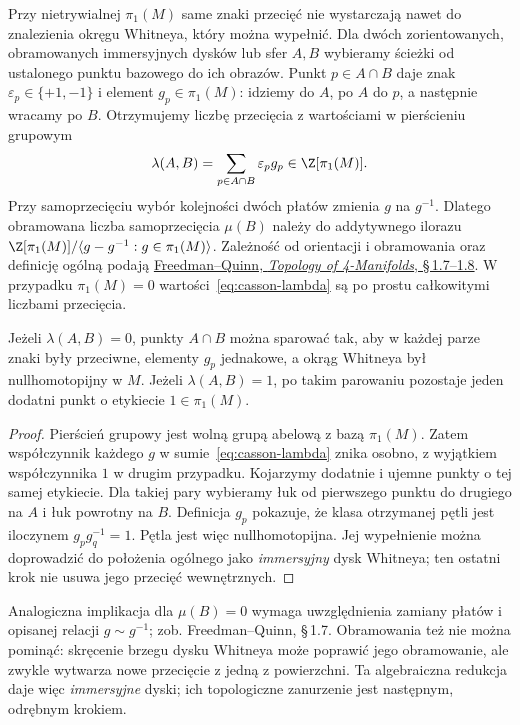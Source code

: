 Przy nietrywialnej $\pi_1(M)$ same znaki przecięć
nie wystarczają nawet do znalezienia okręgu
Whitneya, który można wypełnić. Dla dwóch
zorientowanych, obramowanych immersyjnych dysków
lub sfer $A,B$ wybieramy ścieżki od ustalonego
punktu bazowego do ich obrazów. Punkt
$p\in A\cap B$ daje znak $\varepsilon_p\in\{+1,-1\}$
i element $g_p\in\pi_1(M)$: idziemy do $A$,
po $A$ do $p$, a następnie wracamy po $B$.
Otrzymujemy liczbę przecięcia z wartościami w
pierścieniu grupowym
\begin{equation}\label{eq:casson-lambda}
 \lambda(A,B)=\sum_{p\in A\cap B}
             \varepsilon_p g_p\in\Z[\pi_1(M)].
\end{equation}
Przy samoprzecięciu wybór kolejności dwóch płatów
zmienia $g$ na $g^{-1}$. Dlatego obramowana
liczba samoprzecięcia $\mu(B)$ należy do
addytywnego ilorazu
$\Z[\pi_1(M)]/\langle g-g^{-1}:g\in\pi_1(M)\rangle$.
Zależność od orientacji i obramowania oraz definicję
ogólną podają
\href{https://archive.mpim-bonn.mpg.de/4789/2/FreedmanQuinn-TopologyOf4Manifolds-Reformatted2013.pdf}
{Freedman--Quinn, \emph{Topology of 4-Manifolds},
\S\,1.7--1.8}. W przypadku $\pi_1(M)=0$
wartości~\eqref{eq:casson-lambda} są po prostu
całkowitymi liczbami przecięcia.

\begin{stwierdzenie}
\label{prop:casson-pairing}
Jeżeli $\lambda(A,B)=0$, punkty $A\cap B$ można
sparować tak, aby w każdej parze znaki były
przeciwne, elementy $g_p$ jednakowe, a okrąg
Whitneya był nullhomotopijny w $M$. Jeżeli
$\lambda(A,B)=1$, po takim parowaniu pozostaje
jeden dodatni punkt o etykiecie $1\in\pi_1(M)$.
\end{stwierdzenie}
\begin{proof}
Pierścień grupowy jest wolną grupą abelową z bazą
$\pi_1(M)$. Zatem współczynnik każdego $g$
w sumie~\eqref{eq:casson-lambda} znika osobno,
z wyjątkiem współczynnika $1$ w drugim przypadku.
Kojarzymy dodatnie i ujemne punkty o tej samej
etykiecie. Dla takiej pary wybieramy łuk od
pierwszego punktu do drugiego na $A$ i łuk
powrotny na $B$. Definicja $g_p$ pokazuje,
że klasa otrzymanej pętli jest iloczynem
$g_p g_q^{-1}=1$. Pętla jest więc nullhomotopijna.
Jej wypełnienie można doprowadzić do położenia
ogólnego jako \emph{immersyjny} dysk Whitneya;
ten ostatni krok nie usuwa jego przecięć wewnętrznych.
\end{proof}

Analogiczna implikacja dla $\mu(B)=0$ wymaga
uwzględnienia zamiany płatów i opisanej relacji
$g\sim g^{-1}$; zob.
Freedman--Quinn, \S\,1.7. Obramowania też
nie można pominąć: skręcenie brzegu dysku
Whitneya może poprawić jego obramowanie,
ale zwykle wytwarza nowe przecięcie z jedną
z powierzchni. Ta algebraiczna redukcja daje
więc \emph{immersyjne} dyski; ich topologiczne
zanurzenie jest następnym, odrębnym krokiem.

